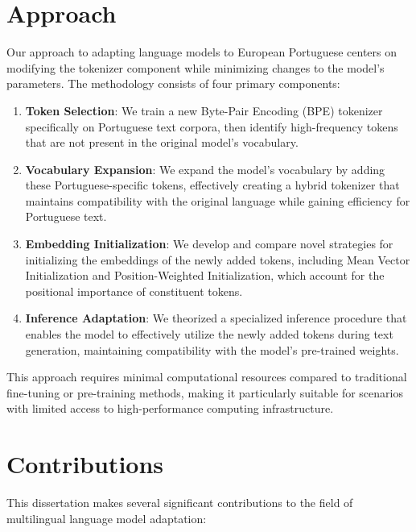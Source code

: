 \section{Approach}\label{Section1.3}
Our approach to adapting language models to European Portuguese centers on modifying the tokenizer component while minimizing changes to the model's parameters. The methodology consists of four primary components:

\begin{enumerate}
    \item \textbf{Token Selection}: We train a new Byte-Pair Encoding (BPE) tokenizer specifically on Portuguese text corpora, then identify high-frequency tokens that are not present in the original model's vocabulary.
    
    \item \textbf{Vocabulary Expansion}: We expand the model's vocabulary by adding these Portuguese-specific tokens, effectively creating a hybrid tokenizer that maintains compatibility with the original language while gaining efficiency for Portuguese text.
    
    \item \textbf{Embedding Initialization}: We develop and compare novel strategies for initializing the embeddings of the newly added tokens, including Mean Vector Initialization and Position-Weighted Initialization, which account for the positional importance of constituent tokens.
    
    \item \textbf{Inference Adaptation}: We theorized a specialized inference procedure that enables the model to effectively utilize the newly added tokens during text generation, maintaining compatibility with the model's pre-trained weights.
\end{enumerate}

This approach requires minimal computational resources compared to traditional fine-tuning or pre-training methods, making it particularly suitable for scenarios with limited access to high-performance computing infrastructure.

\section{Contributions}\label{Section1.4}
This dissertation makes several significant contributions to the field of multilingual language model adaptation:

